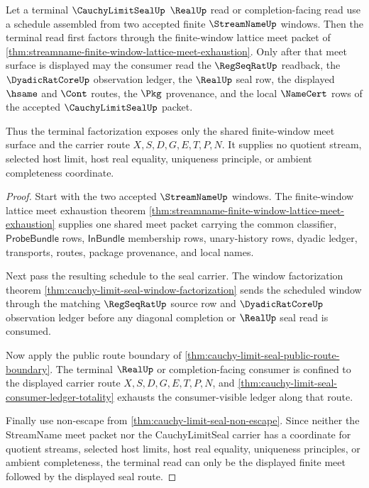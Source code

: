 \begin{theorem}
\label{thm:cauchy-limit-seal-lattice-meet-terminal-factorization}
Let a terminal $\CauchyLimitSealUp$ $\RealUp$ read or completion-facing read use a schedule assembled from two accepted finite $\StreamNameUp$ windows. Then the terminal read first factors through the finite-window lattice meet packet of \autoref{thm:streamname-finite-window-lattice-meet-exhaustion}. Only after that meet surface is displayed may the consumer read the $\RegSeqRatUp$ readback, the $\DyadicRatCoreUp$ observation ledger, the $\RealUp$ seal row, the displayed $\hsame$ and $\Cont$ routes, the $\Pkg$ provenance, and the local $\NameCert$ rows of the accepted $\CauchyLimitSealUp$ packet.

Thus the terminal factorization exposes only the shared finite-window meet surface and the carrier route $X,S,D,G,E,T,P,N$. It supplies no quotient stream, selected host limit, host real equality, uniqueness principle, or ambient completeness coordinate.
\end{theorem}
\begin{proof}
Start with the two accepted $\StreamNameUp$ windows. The finite-window lattice meet exhaustion theorem \autoref{thm:streamname-finite-window-lattice-meet-exhaustion} supplies one shared meet packet carrying the common classifier, $\mathsf{ProbeBundle}$ rows, $\mathsf{InBundle}$ membership rows, unary-history rows, dyadic ledger, transports, routes, package provenance, and local names.

Next pass the resulting schedule to the seal carrier. The window factorization theorem \autoref{thm:cauchy-limit-seal-window-factorization} sends the scheduled window through the matching $\RegSeqRatUp$ source row and $\DyadicRatCoreUp$ observation ledger before any diagonal completion or $\RealUp$ seal read is consumed.

Now apply the public route boundary of \autoref{thm:cauchy-limit-seal-public-route-boundary}. The terminal $\RealUp$ or completion-facing consumer is confined to the displayed carrier route $X,S,D,G,E,T,P,N$, and \autoref{thm:cauchy-limit-seal-consumer-ledger-totality} exhausts the consumer-visible ledger along that route.

Finally use non-escape from \autoref{thm:cauchy-limit-seal-non-escape}. Since neither the StreamName meet packet nor the CauchyLimitSeal carrier has a coordinate for quotient streams, selected host limits, host real equality, uniqueness principles, or ambient completeness, the terminal read can only be the displayed finite meet followed by the displayed seal route.
\end{proof}

